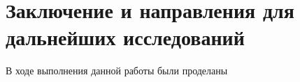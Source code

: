 \chapter{Заключение и направления для дальнейших исследований} \label{conclusion}


В ходе выполнения данной работы были проделаны 

